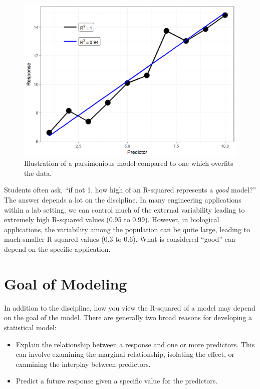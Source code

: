 \documentclass[]{book}
\providecommand{\tightlist}{%
  \setlength{\itemsep}{0pt}\setlength{\parskip}{0pt}}
\theoremstyle{definition}
\theoremstyle{definition}
\theoremstyle{definition}
\theoremstyle{remark}
\begin{document}
\begin{figure}

{\centering \includegraphics[width=0.8\linewidth]{./Images/regquality-overfit-1} 

}

\caption{Illustration of a parsimonious model compared to one which overfits the data.}\label{fig:regquality-overfit}
\end{figure}

Students often ask, ``if not 1, how high of an R-squared represents a
\emph{good} model?'' The answer depends a lot on the discipline. In many
engineering applications within a lab setting, we can control much of
the external variability leading to extremely high R-squared values
(0.95 to 0.99). However, in biological applications, the variability
among the population can be quite large, leading to much smaller
R-squared values (0.3 to 0.6). What is considered ``good'' can depend on
the specific application.

\section{Goal of Modeling}\label{goal-of-modeling}

In addition to the discipline, how you view the R-squared of a model may
depend on the goal of the model. There are generally two broad reasons
for developing a statistical model:

\begin{itemize}
\tightlist
\item
  Explain the relationship between a response and one or more
  predictors. This can involve examining the marginal relationship,
  isolating the effect, or examining the interplay between predictors.
\item
  Predict a future response given a specific value for the predictors.
\end{itemize}
\end{document}
